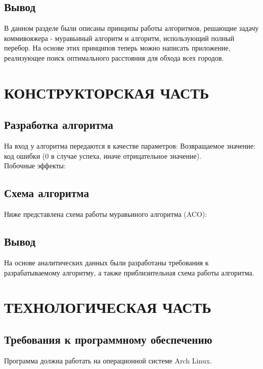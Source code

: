 \documentclass[a4paper,12pt]{article}
\begin{document}
\newpage
\subsection{Вывод}
В данном разделе были описаны принципы работы алгоритмов, решающие задачу коммивояжера - муравьиный алгоритм и алгоритм, использующий полный перебор. На основе этих принципов теперь можно написать приложение, реализующее поиск оптимального расстояния для обхода всех городов.

\newpage
\section{КОНСТРУКТОРСКАЯ ЧАСТЬ}

\subsection{Разработка алгоритма}
На вход у алгоритма передаются в качестве параметров:
Возвращаемое значение: код ошибки (0 в случае успеха, иначе отрицательное значение). \\
Побочные эффекты:

\newpage
\subsection{Схема алгоритма}
Ниже представлена схема работы муравьиного алгоритма (ACO):\\

\newpage
\subsection{Вывод}
На основе аналитических данных были разработаны требования к разрабатываемому алгоритму, а также приблизительная схема работы алгоритма.


\newpage
\section{ТЕХНОЛОГИЧЕСКАЯ ЧАСТЬ}
\subsection{Требования к программному обеспечению}

Программа должна работать на операционной системе Arch Linux.
\end{document}

